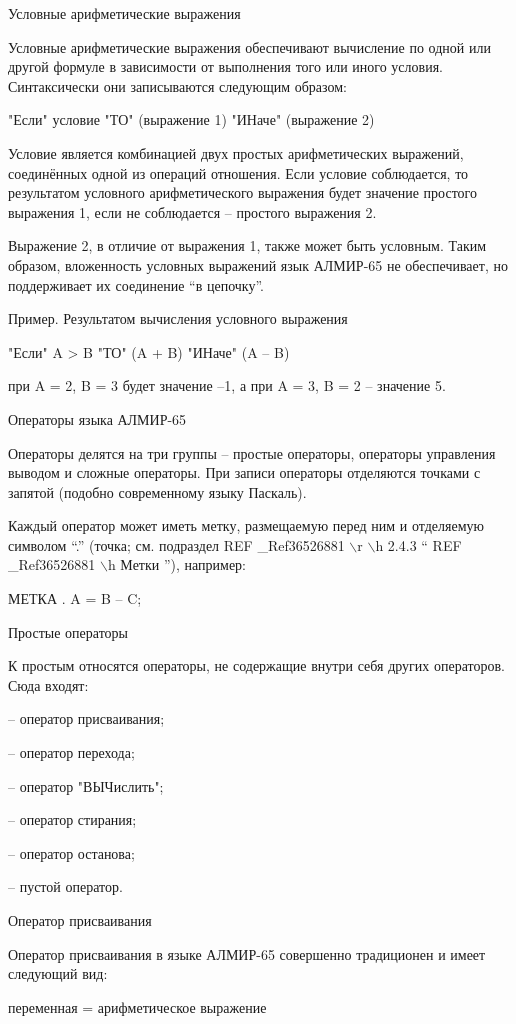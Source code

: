 \documentclass[11pt]{article}
\begin{document}
Условные арифметические выражения

Условные арифметические выражения
обеспечивают вычисление по одной или
другой формуле в зависимости от
выполнения того или иного условия.
Синтаксически они записываются
следующим образом:

"Если" условие "ТО" (выражение 1) "ИНаче"
(выражение 2)

Условие является комбинацией двух
простых арифметических выражений,
соединённых одной из операций
отношения. Если условие соблюдается, то
результатом условного арифметического
выражения будет значение простого
выражения 1, если не соблюдается –
простого выражения 2.

Выражение 2, в отличие от выражения 1,
также может быть условным. Таким
образом, вложенность условных
выражений язык АЛМИР-65 не обеспечивает,
но поддерживает их соединение “в
цепочку”.

Пример. Результатом вычисления
условного выражения

"Если" A > B "ТО" (A + B) "ИНаче" (A – B)

при A = 2, B = 3 будет значение –1, а при A = 3, B
= 2 – значение 5.

Операторы языка АЛМИР-65

Операторы делятся на три группы –
простые операторы, операторы
управления выводом и сложные
операторы. При записи операторы
отделяются точками с запятой (подобно
современному языку Паскаль).

Каждый оператор может иметь метку,
размещаемую перед ним и отделяемую
символом “.” (точка; см. подраздел   REF
\_Ref36526881 $\backslash$r $\backslash$h  2.4.3  “  REF \_Ref36526881
$\backslash$h  Метки ”), например:

МЕТКА . A = B – C;

Простые операторы

К простым относятся операторы, не
содержащие внутри себя других
операторов. Сюда входят:

– оператор присваивания;

– оператор перехода;

– оператор "ВЫЧислить";

– оператор стирания;

\-– оператор останова;

– пустой оператор.

Оператор присваивания

Оператор присваивания в языке АЛМИР-65
совершенно традиционен и имеет
следующий вид:

переменная = арифметическое выражение
\end{document}
